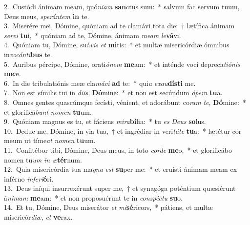 {2.~}Custódi ánimam meam, quó\textit{ni}\textit{am} \textbf{san}ctus sum:~* salvum fac servum tuum, Deus meus, \textit{spe}\textit{rán}\textit{tem} \textbf{in} te.\\
{3.~}Miserére mei, Dómine, quóniam ad te clamávi tota die:~† lætífica ánimam \textit{ser}\textit{vi} \textbf{tu}i,~* quóniam ad te, Dómine, ánimam \textit{me}\textit{am} \textit{le}\textbf{vá}vi.\\
{4.~}Quóniam tu, Dómine, suá\textit{vis} \textit{et} \textbf{mi}tis:~* et multæ misericórdiæ ómnibus in\textit{vo}\textit{cán}\textit{ti}\textbf{bus} te.\\
{5.~}Auribus pércipe, Dómine, orati\textit{ó}\textit{nem} \textbf{me}am:~* et inténde voci depreca\textit{ti}\textit{ó}\textit{nis} \textbf{me}æ.\\
{6.~}In die tribulatiónis meæ cla\textit{má}\textit{vi} \textbf{ad} te:~* qui\textit{a} \textit{e}\textit{xau}\textbf{dí}\textbf{sti} me.\\
{7.~}Non est símilis tui in \textit{di}\textit{is}, \textbf{Dó}mine:~* et non est secúndum \textit{ó}\textit{pe}\textit{ra} \textbf{tu}a.\\
{8.~}Omnes gentes quascúmque fecísti, vénient, et adorábunt co\textit{ram} \textit{te}, \textbf{Dó}mine:~* et glorificá\textit{bunt} \textit{no}\textit{men} \textbf{tu}um.\\
{9.~}Quóniam magnus es tu, et fáciens \textit{mi}\textit{ra}\textbf{bí}lia:~* tu \textit{es} \textit{De}\textit{us} \textbf{so}lus.\\
{10.~}Deduc me, Dómine, in via tua,~† et ingrédiar in veri\textit{tá}\textit{te} \textbf{tu}a:~* lætétur cor meum ut tíme\textit{at} \textit{no}\textit{men} \textbf{tu}um.\\
{11.~}Confitébor tibi, Dómine, Deus meus, in toto \textit{cor}\textit{de} \textbf{me}o,~* et glorificábo nomen tu\textit{um} \textit{in} \textit{æ}\textbf{tér}num.\\
{12.~}Quia misericórdia tua ma\textit{gna} \textit{est} \textbf{su}per me:~* et eruísti ánimam meam ex inférno \textit{in}\textit{fe}\textit{ri}\textbf{ó}ri.\\
{13.~}Deus iníqui insurrexérunt super me,~† et synagóga poténtium quæsiérunt á\textit{ni}\textit{mam} \textbf{me}am:~* et non proposuérunt te in \textit{con}\textit{spé}\textit{ctu} \textbf{su}o.\\
{14.~}Et tu, Dómine, Deus miserátor \textit{et} \textit{mi}\textbf{sé}ricors,~* pátiens, et multæ misericór\textit{di}\textit{æ}, \textit{et} \textbf{ve}rax.\\
